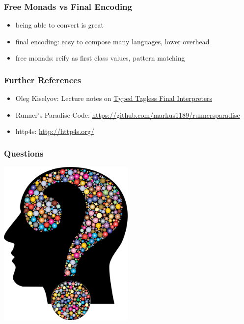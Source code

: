 \documentclass{beamer}
\begin{document}
\begin{frame}
  \frametitle{Free Monads vs Final Encoding}
  \begin{itemize}
  \item being able to convert is great
  \item final encoding: easy to compose many languages, lower overhead
  \item free monads: reify as first class values, pattern matching
  \end{itemize}
\end{frame}

\begin{frame}
  \frametitle{Further References}
  \begin{itemize}
  \item Oleg Kiselyov: Lecture notes on
    \href{http://okmij.org/ftp/tagless-final/course/lecture.pdf}{Typed
      Tagless Final Interpreters}
  \item Runner's Paradise Code:
    \url{https://github.com/markus1189/runnersparadise}
  \item http4s: \url{http://http4s.org/}
  \end{itemize}
\end{frame}

\begin{frame}
  \frametitle{Questions}
  \begin{center}
    \includegraphics[width=0.5\textwidth]{../pics/questions.png}
  \end{center}
\end{frame}
\end{document}
